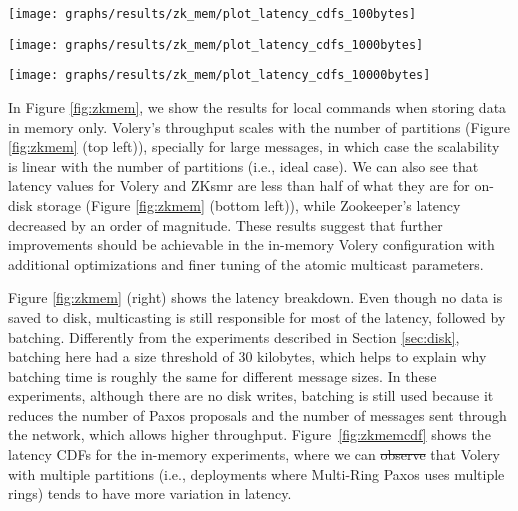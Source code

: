 \documentclass[10pt, conference, compsocconf, letterpaper]{IEEEtranv17}
\providecommand{\DIFadd}[1]{{\protect\color{blue}\uwave{#1}}} %
\providecommand{\DIFdel}[1]{{\protect\color{red}\sout{#1}}}                      %
\providecommand{\DIFaddbegin}{} %
\providecommand{\DIFaddend}{} %
\providecommand{\DIFdelbegin}{} %
\providecommand{\DIFdelend}{} %
\begin{document}
\begin{figure*}

\begin{minipage}[b]{0.3333\linewidth} %
\centering
      \texttt{[image: graphs/results/zk\_mem/plot\_latency\_cdfs\_100bytes]}
\end{minipage}
\begin{minipage}[b]{0.3333\linewidth}
\centering
      \texttt{[image: graphs/results/zk\_mem/plot\_latency\_cdfs\_1000bytes]}
\end{minipage}
\begin{minipage}[b]{0.3333\linewidth}
\centering
      \texttt{[image: graphs/results/zk\_mem/plot\_latency\_cdfs\_10000bytes]}
\end{minipage}
\caption{Cumulative distribution function (CDF) of latency for different command sizes (in-memory storage).}
\label{fig:zkmemcdf}
\end{figure*}

In Figure \ref{fig:zkmem}, we show the results for local commands when storing data in memory only. 
Volery's throughput scales with the number of partitions (Figure \ref{fig:zkmem} (top left)), specially for large messages, in which case the scalability is linear with the number of partitions (i.e., ideal case). 
We can also see that latency values for Volery and ZKsmr are less than half of what they are for on-disk storage (Figure \ref{fig:zkmem} (bottom left)), while Zookeeper's latency decreased by an order of magnitude. 
These results suggest that further improvements should be achievable in the in-memory Volery configuration with additional optimizations and finer tuning of the atomic multicast parameters.

Figure \ref{fig:zkmem} (right) shows the latency breakdown. 
Even though no data is saved to disk, multicasting is still responsible for most of the latency, followed by batching. 
Differently from the experiments described in Section \ref{sec:disk}, batching here had a size threshold of 30 kilobytes, which helps to explain why batching time is roughly the same for different message sizes. 
In these experiments, although there are no disk writes, batching is still used because it reduces the number of Paxos proposals and the number of messages sent through the network, which allows higher throughput. 
Figure~\ref{fig:zkmemcdf} shows the latency CDFs for the in-memory experiments, where we can \DIFdelbegin \DIFdel{observe }\DIFdelend \DIFaddbegin \DIFadd{see }\DIFaddend that Volery with multiple partitions (i.e., deployments where Multi-Ring Paxos uses multiple rings) tends to have more variation in latency.
\end{document}
